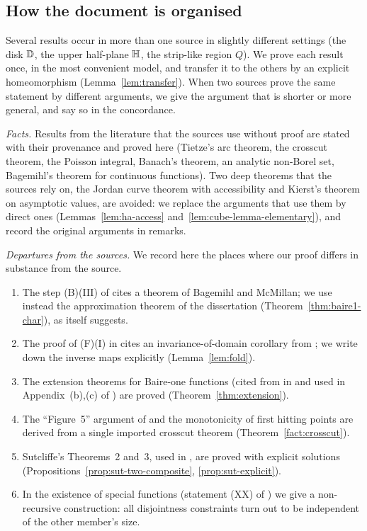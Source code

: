 \subsection{How the document is organised}
Several results occur in more than one source in slightly different settings (the disk $\mathbb{D}$, the upper
half-plane $\mathbb{H}$, the strip-like region $Q$). We prove each result once, in the most convenient model,
and transfer it to the others by an explicit homeomorphism (Lemma~\ref{lem:transfer}). When two
sources prove the same statement by different arguments, we give the argument that is shorter or more
general, and say so in the concordance.

\emph{Facts.} Results from the literature that the sources use without proof are stated with their
provenance and proved here (Tietze's arc theorem, the crosscut theorem, the Poisson integral, Banach's
theorem, an analytic non-Borel set, Bagemihl's theorem for continuous functions). Two deep theorems that
the sources rely on, the Jordan curve theorem with accessibility and Kierst's theorem on asymptotic
values, are avoided: we replace the arguments that use them by direct ones (Lemmas~\ref{lem:ha-access}
and~\ref{lem:cube-lemma-elementary}), and record the original arguments in remarks.

\emph{Departures from the sources.} We record here the places where our proof differs in substance from
the source.
\begin{enumerate}[label=(\roman*)]
\item The step (B)(III) of \cite{TAMSb} cites a theorem of Bagemihl and McMillan; we use instead the
  approximation theorem of the dissertation (Theorem~\ref{thm:baire1-char}), as \cite{TAMSb} itself
  suggests.
\item The proof of (F)(I) in \cite{TAMSb} cites an invariance-of-domain corollary from \cite{Newman}; we
  write down the inverse maps explicitly (Lemma~\ref{lem:fold}).
\item The extension theorems for Baire-one functions (cited from \cite{Hausdorff} in \cite{Diss} and
  used in Appendix~(b),(c) of \cite{TAMSb}) are proved (Theorem~\ref{thm:extension}).
\item The ``Figure~5'' argument of \cite{Diss} and the monotonicity of first hitting points are derived
  from a single imported crosscut theorem (Theorem~\ref{fact:crosscut}).
\item Sutcliffe's Theorems~2 and~3, used in \cite{MathMag}, are proved with explicit solutions
  (Propositions~\ref{prop:sut-two-composite}, \ref{prop:sut-explicit}).
\item In the existence of special functions (statement (XX) of \cite{TAMSb}) we give a non-recursive
  construction: all disjointness constraints turn out to be independent of the other member's size.
\end{enumerate}

